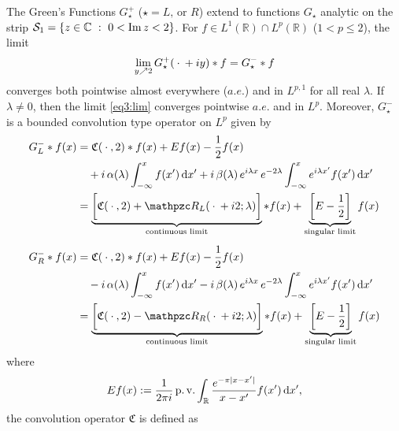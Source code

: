 \documentclass[../dissertation.tex]{subfiles}
\begin{document}
\begin{thm}\label{thm3:main_result}
	The Green's Functions $G_\star^+$ ($\star = L \text{, or }R$) extend to 
	functions $G_\star$ analytic 
	on the strip $\mathcal S_1 = \{z \in \mathbb C ~:~ 0 < \operatorname{Im} z < 2 \}$.
	For 
	$f \in L^1(\mathbb R) \cap L^p(\mathbb R)$ ($1< p \leq 2$), the limit
	\begin{align}\label{eq3:lim}
		\lim_{y\nearrow 2} G_\star^+(\kern 0.5ex \cdot \kern 0.5ex+iy)*f = G_\star^- * f
	\end{align}
	converges both pointwise almost everywhere ($a.e.$\label{sym:ae}) and in 
	$L^{p,1}$ 
	for all real $\lambda$. If $\lambda \ne 0$, then the limit 
	\eqref{eq3:lim} converges pointwise $a.e.$ and in $L^p$. 
	Moreover, $G_\star^-$ is a bounded
	convolution type operator on $L^p$ given by 
	\begin{subequations} \label{eq3:GstarMinus}
		\begin{align} 
		\label{eq3:GLminus}
		G_L^- * f(x)
			&= \mathfrak C(\dotarg, 2) * f(x) + Ef(x) - \frac{1}{2} f(x) \\
			&\quad + i \, \alpha(\lambda) \int_{-\infty}^x f(x')\, \mathrm{d}x' 
				+ i\, \beta(\lambda) \,e^{i\lambda x} \, e^{-2\lambda} 
					\int_{-\infty}^x e^{i\lambda x'} f(x')\, \mathrm{d}x' 
				\nonumber \\
			&= 
				\underbrace{
					\bigg[\mathfrak C(\dotarg, 2) + \mathpzc R_L(\dotarg+i2; \lambda)\bigg]
				}_{\text{continuous limit}}
				* f(x)
				+ 
				\underbrace{
					\left[E - \frac{1}{2}\right]
				}_{\text{singular limit}}f(x)
				\nonumber \\[0.3\baselineskip]
		\label{eq3:GRminus}
		G_R^- * f(x)
			&= \mathfrak C(\dotarg, 2) * f(x) + Ef(x) - \frac{1}{2} f(x) \\
			&\quad - i \, \alpha(\lambda) \int_{-\infty}^x f(x')\, \mathrm{d}x' 
				- i\, \beta(\lambda) \,e^{i\lambda x} \, e^{-2\lambda} 
					\int_{-\infty}^x e^{i\lambda x'} f(x')\, \mathrm{d}x' 
				\nonumber \\
			&= 
				\underbrace{
					\bigg[\mathfrak C(\dotarg, 2) - \mathpzc R_R( \dotarg+i2; \lambda)\bigg]
				}_{\text{continuous limit}}
				* f(x) 
				+
				\underbrace{
					\left[E - \frac{1}{2}\right]
				}_{\text{singular limit}}f(x)
				\nonumber 
		\end{align}
	\end{subequations}
	where
	\[
		Ef(x) 
			:= \frac{1}{2\pi i} \operatorname{p.v.} \int_{\mathbb R} 
					\frac{e^{-\pi|x-x'|}}{x-x'} f(x') 
				\, \mathrm{d}x', \label{sym:ExpHil}
	\]
	the convolution operator $\mathfrak C$\label{sym:mathfrakC} is defined as

\end{thm}
\end{document}
